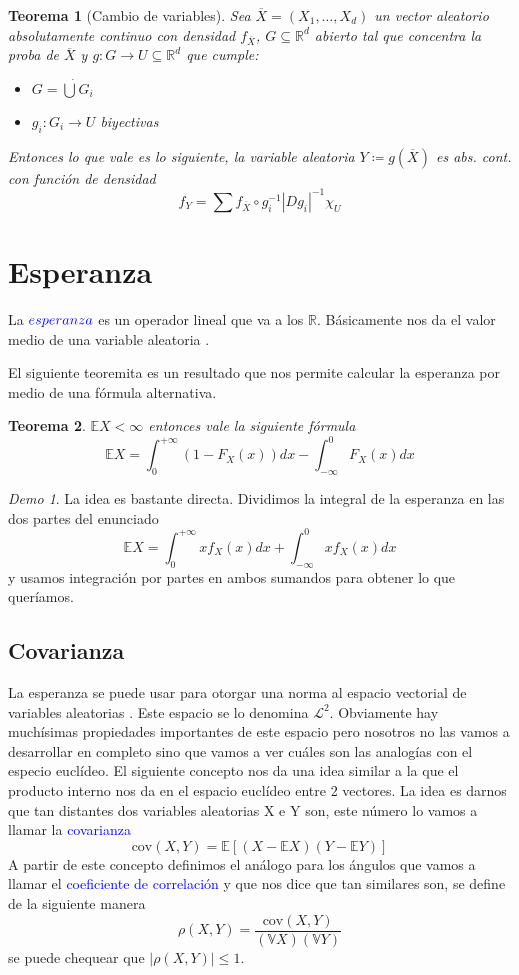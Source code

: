 \documentclass[11pt]{article}
\theoremstyle{plain} %
\newtheorem{teorema}{Teorema}
\theoremstyle{definition}
\theoremstyle{remark}
\newtheorem*{demo}{Demo}
\def\V{\mathbb{V}}
\def\E{\mathbb{E}}
\def\R{\mathbb{R}}
\def\va{variable aleatoria }
\def\vas{variables aleatorias }
\def\blue{\textcolor{blue}}
\begin{document}
\begin{teorema}
	[Cambio de variables]
	Sea $\overline{X} = \left( X_1, \dots , X_d \right)$ un vector aleatorio absolutamente continuo con densidad $f_{\overline{X}}$, $G \subseteq \R^d$ abierto tal que concentra la proba de $\overline{X}$ y $g:G \to U \subseteq \R^d$ que cumple:
	\begin{itemize}
		\item $G = \dot{\bigcup} G_i$
		\item  $g_{i}:G_{i} \to U$ biyectivas
	\end{itemize}
	Entonces lo que vale es lo siguiente, la \va $Y \coloneqq g(\overline{X})$ es abs. cont. con función de densidad
	\[f_Y = \sum f_{\overline{X}} \circ g_{i} ^{-1} |Dg_i|^{-1} \chi_U \]
\end{teorema}



\bigskip

\section{Esperanza}

La $\blue{esperanza}$ es un operador lineal que va a los $\R$. Básicamente nos da el valor medio de una \va. 

El siguiente teoremita es un resultado que nos permite calcular la esperanza por medio de una fórmula alternativa.

\begin{teorema}
	$\E X < \infty$ entonces vale la siguiente fórmula
	\[ \E X = \int_{0}^{+ \infty}  \left( 1 - F_{X}(x)\right)  dx - \int_{- \infty}^{0} F_{X}(x) dx \]
\end{teorema}

\begin{demo}
	La idea es bastante directa. Dividimos la integral de la esperanza en las dos partes del enunciado 
	\[ \E X = \int_{0}^{+ \infty}xf_{X}(x) dx + \int_{- \infty}^{0} xf_{X}(x) dx \]
	y usamos integración por partes en ambos sumandos para obtener lo que queríamos.
\end{demo}


\subsection{Covarianza}

La esperanza se puede usar para otorgar una norma al espacio vectorial de \vas. Este espacio se lo denomina $\mathcal{L}^2$. Obviamente hay muchísimas propiedades importantes de este espacio pero nosotros no las vamos a desarrollar en completo sino que vamos a ver cuáles son las analogías con el especio euclídeo. El siguiente concepto nos da una idea similar a la que el producto interno nos da en el espacio euclídeo entre 2 vectores. La idea es darnos que tan distantes dos \vas X e Y son, este número lo vamos a llamar la \blue{covarianza}
\[ \text{cov}(X,Y) = \E \left[ \left( X - \E X \right) \left( Y - \E Y \right) \right]  \]
A partir de este concepto definimos el análogo para los ángulos que vamos a llamar el \blue{coeficiente de correlación} y que nos dice que tan similares son, se define de la siguiente manera
\[ \rho(X,Y) = \dfrac{\text{cov}(X,Y)}{(\V X) (\V Y)} \]
se puede chequear que $|\rho(X,Y)| \leq 1$.
\end{document}
